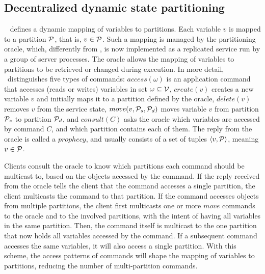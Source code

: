 \subsection{Decentralized dynamic state partitioning}

\dssmr{}~\cite{le2016dssmr} defines a dynamic mapping of variables to partitions.
Each variable $v$ is mapped to a partition $\mathcal{P}$, that is, $v \in \mathcal{P}$.
Such a mapping is managed by the partitioning oracle, which, differently from \ssmr, is now implemented as a replicated service run by a group of server processes.
The oracle allows the mapping of variables to partitions to be retrieved or changed during execution.
In more detail, \dssmr\ distinguishes five types of commands:
$access(\omega)$ is an application command that accesses (reads or writes) variables in set $\omega \subseteq \mathcal{V}$,
$create(v)$ creates a new variable $v$ and initially maps it to a partition defined by the oracle,
$delete(v)$ removes $v$ from the service state,
$move(v,\mathcal{P}_s,\mathcal{P}_d)$ moves variable $v$ from partition $\mathcal{P}_s$ to partition $\mathcal{P}_d$,
and $consult(C)$ asks the oracle which variables are accessed by command $C$, and which partition contains each of them.
The reply from the oracle is called a $prophecy$, and usually consists of a set of tuples $\langle v, \mathcal{P} \rangle$, meaning $v \in \mathcal{P}$.


Clients consult the oracle to know which partitions each command should be multicast to, based on the objects accessed by the command.
If the reply received from the oracle tells the client that the command accesses a single partition, the client multicasts the command to that partition.
If the command accesses objects from multiple partitions, the client first multicasts one or more $move$ commands to the oracle and to the involved partitions, with the intent of having all variables in the same partition.
Then, the command itself is multicast to the one partition that now holds all variables accessed by the command.
If a subsequent command accesses the same variables, it will also access a single partition.
With this scheme, the access patterns of commands will shape the mapping of variables to partitions, reducing the number of multi-partition commands.

